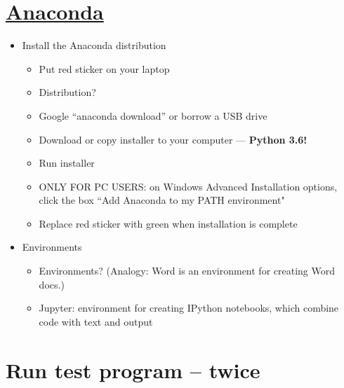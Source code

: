 \section*{\href{https://www.anaconda.com/download/}{Anaconda}}

\begin{itemize}
\item Install the Anaconda distribution
\begin{itemize}
\item Put red sticker on your laptop
\item Distribution?
\item Google ``anaconda download'' or borrow a USB drive
\item Download or copy installer to your computer --- {\bf Python 3.6!}
\item Run installer
\item ONLY FOR PC USERS: on Windows Advanced Installation options, click the box ``Add Anaconda to my PATH environment"
\item Replace red sticker with green when installation is complete
\end{itemize}

\item Environments
\begin{itemize}
\item Environments?  (Analogy:  Word is an environment for creating Word docs.)
\item Jupyter:  environment for creating IPython notebooks, which combine code with text and output
\end{itemize}
\end{itemize}




\section*{Run test program -- twice}

